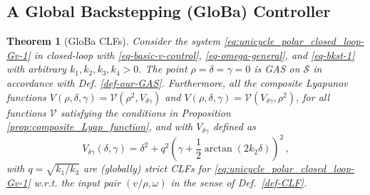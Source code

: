 \documentclass[journal,twoside,web]{ieeecolor}
\newtheorem{theorem}{Theorem}
\theoremstyle{definition}
\begin{document}
\subsection{A Global Backstepping (GloBa) Controller}

\begin{theorem}[GloBa CLFs] 
\label{thm:CLF_Globa}
Consider the system \eqref{eq:unicycle_polar_closed_loop-Gv-1} in closed-loop with \eqref{eq-basic-v-control}, \eqref{eq-omega-general}, and \eqref{eq-bkst-1} with arbitrary $k_1, k_2, k_3, k_4 > 0$.
The point $\rho = \delta = \gamma = 0$ is GAS on $\mathcal{S}$ in accordance with Def. \ref{def-our-GAS}.
Furthermore, all the composite Lyapunov functions $V(\rho, \delta, \gamma) = \mathcal{V}(\rho^2, V_{\delta \gamma})$ and $V(\rho, \delta, \gamma) = \mathcal{V}(V_{\delta \gamma},\rho^2)$, for all functions $\mathcal{V}$ satisfying the conditions in Proposition \ref{prop:composite_Lyap_function}, and with $V_{\delta \gamma}$ defined as
\begin{equation}
V_{\delta \gamma}(\delta, \gamma)  = 
\delta^2 + q^2 \left(\gamma+ \frac{1}{2}\arctan(2k_2 \delta)  \right)^2 
\,,  \label{eq:CLF_GloBa_gamma_delta}
\end{equation}
with $q = \sqrt{k_1/k_3}$ are (globally) strict CLFs for \eqref{eq:unicycle_polar_closed_loop-Gv-1} w.r.t. the input pair $(v/\rho,\omega)$ in the sense of Def.~\ref{def-CLF}. 
\end{theorem}
\end{document}
